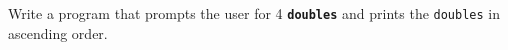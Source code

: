 Write a program that prompts the user for 4 \texttt{\textbf{doubles}} and prints the \texttt{doubles} in ascending order.

